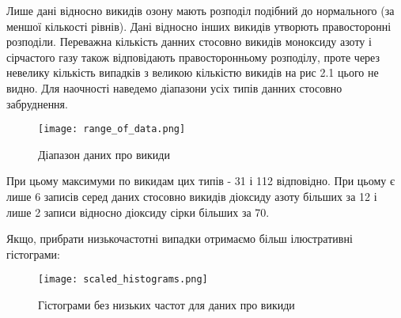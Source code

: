Лише дані відносно викидів озону мають розподіл подібний до нормального (за меншої кількості рівнів).
Дані відносно інших викидів утворють правосторонні розподіли.
Переважна кількість данних стосовно викидів моноксиду азоту і сірчастого газу також відповідають правосторонньому розподілу, проте через невелику кількість випадків з великою кількістю викидів на рис 2.1 цього не видно.
Для наочності наведемо діапазони усіх типів данних стосовно забруднення. 


\begin{figure}[h]
    \begin{center}
        \texttt{[image: range\_of\_data.png]}
        \caption{Діапазон даних про викиди}
    \end{center}
\end{figure}

При цьому максимуми по викидам цих типів - 31 і 112 відповідно. При цьому є лише 6 записів серед даних стосовно викидів діоксиду азоту більших за 12 і лише 2 записи відносно діоксиду сірки більших за 70.

Якщо, прибрати низькочастотні випадки отримаємо більш ілюстративні гістограми: 


\begin{center}
    \begin{figure}[h]
        \texttt{[image: scaled\_histograms.png]}
        \caption{Гістограми без низьких частот для даних про викиди}
    \end{figure}
\end{center}
